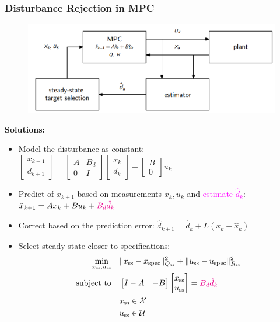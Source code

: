 \subsubsection{Disturbance Rejection in MPC}
\begin{figure}[H]
    \centering
    \includegraphics[width=0.6\linewidth]{images/distMPC.png}
\end{figure}
\textbf{Solutions:}
\begin{itemize}
    \item Model the disturbance as constant: \quad $\begin{bmatrix}
    x_{k+1} \\
    d_{k+1}
    \end{bmatrix}
    =
    \begin{bmatrix}
    A & B_d \\
    0 & I
    \end{bmatrix}
    \begin{bmatrix}
    x_k \\
    d_k
    \end{bmatrix}
    +
    \begin{bmatrix}
    B \\
    0
    \end{bmatrix}
    u_k$
    \item Predict of $x_{k+1}$ based on measurements $x_k, u_k$ and \textcolor{magenta}{estimate $\hat{d}_k$}: \quad $\hat{x}_{k+1} = A x_k + B u_k + \textcolor{magenta}{B_d \hat{d}_k}$
    \item Correct based on the prediction error: \quad $\hat{d}_{k+1} = \hat{d}_k + L \left( x_k - \hat{x}_k \right)$
    \item Select steady-state closer to specifications:
    \begin{align*}
    \min_{x_\mathrm{ss}, u_\mathrm{ss}} \quad & \| x_\mathrm{ss} - x_{\text{spec}} \|_{Q_\mathrm{ss}}^2 + \| u_\mathrm{ss} - u_{\text{spec}} \|_{R_\mathrm{ss}}^2 \\
    \text{subject to} \quad & \begin{bmatrix} I - A & -B \end{bmatrix} \begin{bmatrix} x_\mathrm{ss} \\ u_\mathrm{ss} \end{bmatrix} = \textcolor{magenta}{B_d \hat{d}_k} \\
    & x_\mathrm{ss} \in \mathcal{X} \\
    & u_\mathrm{ss} \in \mathcal{U}
    \end{align*}
\end{itemize}

